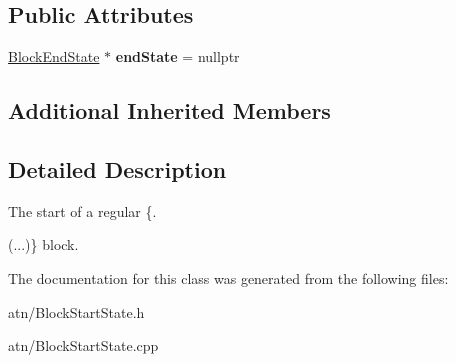 \subsection*{Public Attributes}
\begin{DoxyCompactItemize}
\item 
\mbox{\label{classantlr4_1_1atn_1_1BlockStartState_aa79f25cca90ec823d50f4a8f7b7ec017}} 
\hyperlink{classantlr4_1_1atn_1_1BlockEndState}{Block\+End\+State} $\ast$ {\bfseries end\+State} = nullptr
\end{DoxyCompactItemize}
\subsection*{Additional Inherited Members}


\subsection{Detailed Description}
The start of a regular \{. 


\begin{DoxyCode}
(...)\} block. 
\end{DoxyCode}


The documentation for this class was generated from the following files\+:\begin{DoxyCompactItemize}
\item 
atn/Block\+Start\+State.\+h\item 
atn/Block\+Start\+State.\+cpp\end{DoxyCompactItemize}
